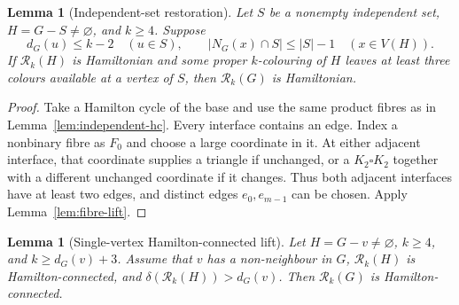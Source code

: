 \documentclass[11pt]{article}
\newtheorem{lemma}[theorem]{Lemma}
\theoremstyle{remark}
\newcommand{\Rk}{\mathcal R_k}
\numberwithin{equation}{section}
\begin{document}
\begin{lemma}[Independent-set restoration]
\label{lem:independent-restoration}
Let $S$ be a nonempty independent set, $H=G-S\ne\varnothing$, and
$k\ge4$.  Suppose
\[
 d_G(u)\le k-2\quad(u\in S),\qquad
 |N_G(x)\cap S|\le |S|-1\quad(x\in V(H)).
\]
If $\Rk(H)$ is Hamiltonian and some proper $k$-colouring of $H$ leaves
at least three colours available at a vertex of $S$, then $\Rk(G)$ is
Hamiltonian.
\end{lemma}

\begin{proof}
Take a Hamilton cycle of the base and use the same product fibres as in
Lemma~\ref{lem:independent-hc}.  Every interface contains an edge.
Index a nonbinary fibre as $F_0$ and choose a large coordinate in it.
At either adjacent interface, that coordinate supplies a triangle if
unchanged, or a $K_2\square K_2$ together with a different unchanged
coordinate if it changes.  Thus both adjacent interfaces have at least
two edges, and distinct edges $e_0,e_{m-1}$ can be chosen.  Apply
Lemma~\ref{lem:fibre-lift}.
\end{proof}

\begin{lemma}[Single-vertex Hamilton-connected lift]
\label{lem:single-hc}
Let $H=G-v\ne\varnothing$, $k\ge4$, and $k\ge d_G(v)+3$.
Assume that $v$ has a non-neighbour in $G$, $\Rk(H)$ is
Hamilton-connected, and $\delta(\Rk(H))>d_G(v)$.  Then $\Rk(G)$ is
Hamilton-connected.
\end{lemma}
\end{document}
